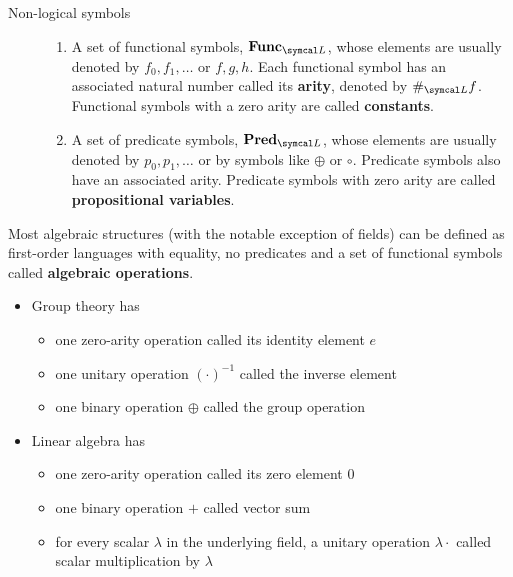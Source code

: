 \begin{definition}
\begin{description}
    \item[Non-logical symbols]
    \mbox{}
    \begin{enumerate}
      \item A set of functional symbols, \( \Bold{Func}_{\Cal{L}} \), whose elements are usually denoted by \( f_0, f_1, \ldots \) or \( f, g, h \). Each functional symbol has an associated natural number called its \textbf{arity}, denoted by \( \#_{\Cal{L}} f \). Functional symbols with a zero arity are called \textbf{constants}.

      \item A set of predicate symbols, \( \Bold{Pred}_{\Cal{L}} \), whose elements are usually denoted by \( p_0, p_1, \ldots \) or by symbols like \( \oplus \) or \( \circ \). Predicate symbols also have an associated arity. Predicate symbols with zero arity are called \textbf{propositional variables}.
    \end{enumerate}
  \end{description}
\end{definition}

\begin{example}\label{ex:algebraic_theory_language}\cite[remark 2.1.4]{Leinster2014}
  Most algebraic structures (with the notable exception of fields) can be defined as first-order languages with equality, no predicates and a set of functional symbols called \textbf{algebraic operations}.
  \begin{itemize}
    \item Group theory has
    \begin{itemize}
      \item one zero-arity operation called its identity element \( e \)
      \item one unitary operation \( (\cdot)^{-1} \) called the inverse element
      \item one binary operation \( \oplus \) called the group operation
    \end{itemize}

    \item Linear algebra has
    \begin{itemize}
      \item one zero-arity operation called its zero element \( 0 \)
      \item one binary operation \( + \) called vector sum
      \item for every scalar \( \lambda \) in the underlying field, a unitary operation \( \lambda \cdot \) called scalar multiplication by \( \lambda \)
    \end{itemize}
  \end{itemize}
\end{example}

